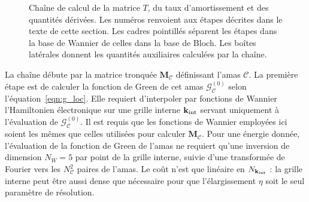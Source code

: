 \clearpage
\vspace*{\fill}
\begin{figure}[htbp]
    \centering
    \hspace{2.5cm}
    
    \caption[Représentation schématique de la chaîne de calcul pour la matrice $T$ et le taux d'amortissement.]{Chaîne de calcul de la matrice $T$, du taux d'amortissement et des quantités dérivées. Les numéros renvoient aux étapes décrites dans le texte de cette section. Les cadres pointillés séparent les étapes dans la base de Wannier de celles dans la base de Bloch. Les boîtes latérales donnent les quantités auxiliaires calculées par la chaîne.}
    \label{fig:chaine_T}
\end{figure}
\vspace*{\fill}
\clearpage


La chaîne débute par la matrice tronquée $\bm M_\mathcal{C}$ définissant l'amas $\mathcal{C}$. La première étape est de calculer la fonction de Green de cet amas $\bm{\mathcal{G}}^{(0)}_\mathcal{C}$ selon l'équation~\eqref{eqn:g_loc}. Elle requiert d'interpoler par fonctions de Wannier l'Hamiltonien électronique sur une grille interne $\mathbf{k}_\text{int}$ servant uniquement à l'évaluation de $\bm{\mathcal{G}}^{(0)}_\mathcal{C}$. Il est requis que les fonctions de Wannier employées ici soient les mêmes que celles utilisées pour calculer $\bm M_\mathcal{C}$. Pour une énergie donnée, l'évaluation de la fonction de Green de l'amas ne requiert qu'une inversion de dimension $N_W=5$ par point de la grille interne, suivie d'une transformée de Fourier vers les $N_\mathcal{C}^2$ paires de l'amas. Le coût n'est que linéaire en $N_{\mathbf{k}_\text{int}}$ : la grille interne peut être aussi dense que nécessaire pour que l'élargissement $\eta$ soit le seul paramètre de résolution.

